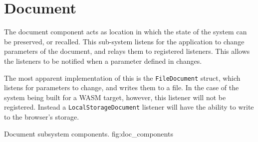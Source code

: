 \section{Document}
The document component acts as location in which the state of the system can be preserved, or recalled.
This sub-system listens for the application to change parameters of the document, and relays them to registered listeners.
This allows the listeners to be notified when a parameter defined in  changes.

The most apparent implementation of this is the \verb|FileDocument| struct, which listens for parameters to change, and writes them to a file.
In the case of the system being built for a WASM target, however, this listener will not be registered.
Instead a \verb|LocalStorageDocument| listener will have the ability to write to the browser's storage.


{Document subsystem components.}
{fig:doc_components}
